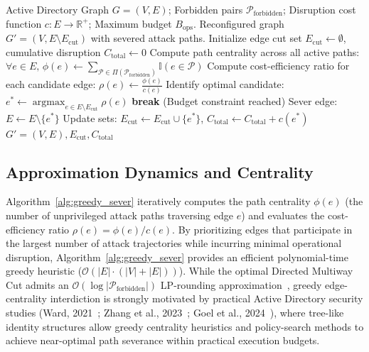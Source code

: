 \begin{algorithm}[ht]
\caption{Greedy Capacity-Disruption Edge Severing Heuristic}
\label{alg:greedy_sever}
\begin{algorithmic}[1]
\Require Active Directory Graph $G = (V, E)$; Forbidden pairs $\mathcal{P}_{\text{forbidden}}$; Disruption cost function $c: E \to \mathbb{R}^+$; Maximum budget $B_{\text{ops}}$.
\Ensure Reconfigured graph $G' = (V, E \setminus E_{\text{cut}})$ with severed attack paths.
\State Initialize edge cut set $E_{\text{cut}} \gets \emptyset$, cumulative disruption $C_{\text{total}} \gets 0$
    \State Compute path centrality across all active paths: $\forall e \in E, \, \phi(e) \gets \sum_{\mathcal{P} \in \Pi(\mathcal{P}_{\text{forbidden}})} \mathbb{I}(e \in \mathcal{P})$
    \State Compute cost-efficiency ratio for each candidate edge:
    \State \quad $\rho(e) \gets \frac{\phi(e)}{c(e)}$
    \State Identify optimal candidate: $e^* \gets \operatorname{argmax}_{e \in E \setminus E_{\text{cut}}} \rho(e)$
        \State \textbf{break} (Budget constraint reached)
    \EndIf
    \State Sever edge: $E \gets E \setminus \{e^*\}$
    \State Update sets: $E_{\text{cut}} \gets E_{\text{cut}} \cup \{e^*\}$, $C_{\text{total}} \gets C_{\text{total}} + c(e^*)$
\EndWhile
\State \Return $G' = (V, E), E_{\text{cut}}, C_{\text{total}}$
\end{algorithmic}
\end{algorithm}

\subsection{Approximation Dynamics and Centrality}
Algorithm~\ref{alg:greedy_sever} iteratively computes the path centrality $\phi(e)$ (the number of unprivileged attack paths traversing edge $e$) and evaluates the cost-efficiency ratio $\rho(e) = \phi(e) / c(e)$. By prioritizing edges that participate in the largest number of attack trajectories while incurring minimal operational disruption, Algorithm~\ref{alg:greedy_sever} provides an efficient polynomial-time greedy heuristic ($\mathcal{O}(|E| \cdot (|V| + |E|))$). While the optimal Directed Multiway Cut admits an $\mathcal{O}(\log |\mathcal{P}_{\text{forbidden}}|)$ LP-rounding approximation~\cite{garg1994multiway}, greedy edge-centrality interdiction is strongly motivated by practical Active Directory security studies (Ward, 2021~\cite{ward2021algorithms}; Zhang et al., 2023~\cite{zhang2023scalable}; Goel et al., 2024~\cite{goel2024hardening}), where tree-like identity structures allow greedy centrality heuristics and policy-search methods to achieve near-optimal path severance within practical execution budgets.


